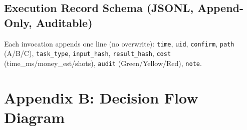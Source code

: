 \documentclass[conference]{IEEEtran}
\theoremstyle{remark}
\begin{document}
\subsection{Execution Record Schema (JSONL, Append-Only, Auditable)}
Each invocation appends one line (no overwrite): \texttt{time}, \texttt{uid}, \texttt{confirm}, \texttt{path} (A/B/C), \texttt{task\_type}, \texttt{input\_hash}, \texttt{result\_hash}, \texttt{cost} (time\_ms/money\_est/shots), \texttt{audit} (Green/Yellow/Red), \texttt{note}.

\section*{Appendix B: Decision Flow Diagram}
\end{document}
